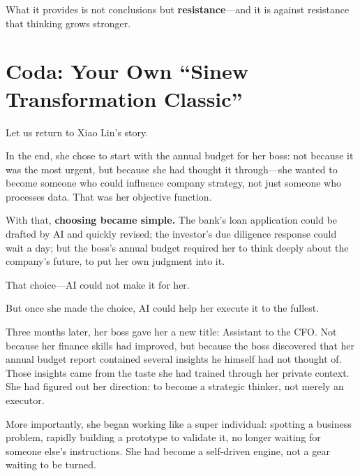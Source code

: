 What it provides is not conclusions but \textbf{resistance}---and it is against resistance that thinking grows stronger.

\newpage
\section{Coda: Your Own ``Sinew Transformation Classic''}
Let us return to Xiao Lin's story.

\vspace{1em}

In the end, she chose to start with the annual budget for her boss: not because it was the most urgent, but because she had thought it through---she wanted to become someone who could influence company strategy, not just someone who processes data. That was her objective function.


\vspace{1em}

With that, \textbf{choosing became simple.}
The bank's loan application could be drafted by AI and quickly revised;
the investor's due diligence response could wait a day;
but the boss's annual budget required her to think deeply about the company's future,
to put her own judgment into it.

\vspace{1em}

That choice---AI could not make it for her.

But once she made the choice, AI could help her execute it to the fullest.

\vspace{1em}

Three months later, her boss gave her a new title: Assistant to the CFO.
Not because her finance skills had improved, but because the boss discovered
that her annual budget report contained several insights he himself had not thought of.
Those insights came from the taste she had trained through her private context.
She had figured out her direction: to become a strategic thinker, not merely an executor.

\vspace{1em}

More importantly, she began working like a super individual:
spotting a business problem, rapidly building a prototype to validate it,
no longer waiting for someone else's instructions.
She had become a self-driven engine, not a gear waiting to be turned.

